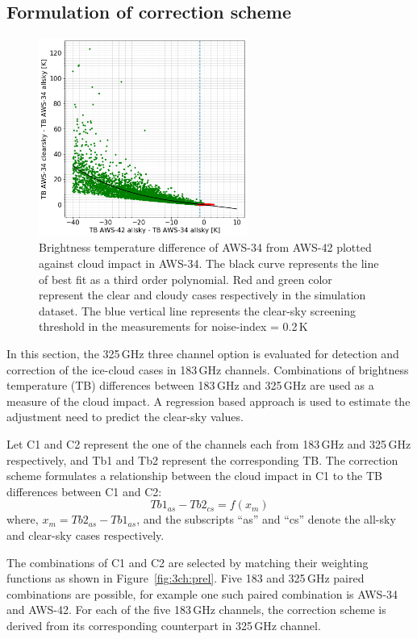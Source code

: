 \documentclass[12pt]{article}
\begin{document}
\subsection{Formulation of correction scheme}
%
\begin{figure}[!tb]
	\centering
	\includegraphics[height=65mm]{fit_AWS-34_AWS-42}\hspace{5mm}%
	\caption{Brightness temperature difference of AWS-34 from AWS-42 plotted against cloud impact in AWS-34. The black curve represents the line of best fit as a third order polynomial. Red and green color represent the clear and cloudy cases respectively in the simulation dataset. The blue vertical line represents the clear-sky screening threshold in the measurements for noise-index = 0.2\,K   }
	\label{fig:fit:c34-42}
\end{figure}
%
In this section, the 325\,GHz three channel option is evaluated for detection and correction of the ice-cloud cases in 183\,GHz channels. Combinations of brightness temperature (TB) differences between 183\,GHz and 325\,GHz are used as a measure of the cloud impact.  A regression based approach is used to estimate the adjustment need to predict the clear-sky values. 

Let C1 and C2 represent the one of the channels each from 183\,GHz and 325\,GHz respectively, and Tb1 and Tb2 represent the corresponding TB. The correction scheme formulates a relationship between the cloud impact in C1 to the TB differences between C1 and C2:
\begin{equation}
Tb1_{as}-Tb2_{cs} = f(x_m)
\label{eq:TB:diff}
\end{equation}
where, $x_m = Tb2_{as} - Tb1_{as}$, and the subscripts ``as'' and ``cs'' denote the all-sky and clear-sky cases respectively.  

The combinations of C1 and C2 are selected by matching their weighting functions as shown in  Figure~\ref{fig:3ch:prel}. Five  183 and 325\,GHz paired combinations are possible, for example one such paired combination is AWS-34 and AWS-42. For each of the five 183\,GHz channels, the correction scheme is derived from its corresponding counterpart in 325\,GHz channel.  
\end{document}
